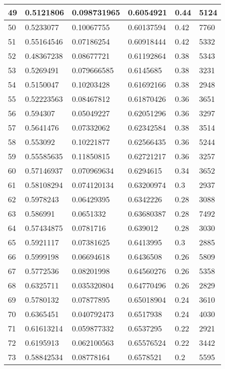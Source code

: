 \begin{longtable}{|l|l|l|l|l|l|}
49 & 0.5121806 & 0.098731965 & 0.6054921 & 0.44 & 5124 \\ \hline 
50 & 0.5233077 & 0.10067755 & 0.60137594 & 0.42 & 7760 \\ \hline 
51 & 0.55164546 & 0.07186254 & 0.60918444 & 0.42 & 5332 \\ \hline 
52 & 0.48367238 & 0.08677721 & 0.61192864 & 0.38 & 5343 \\ \hline 
53 & 0.5269491 & 0.079666585 & 0.6145685 & 0.38 & 3231 \\ \hline 
54 & 0.5150047 & 0.10203428 & 0.61692166 & 0.38 & 2948 \\ \hline 
55 & 0.52223563 & 0.08467812 & 0.61870426 & 0.36 & 3651 \\ \hline 
56 & 0.594307 & 0.05049227 & 0.62051296 & 0.36 & 3297 \\ \hline 
57 & 0.5641476 & 0.07332062 & 0.62342584 & 0.38 & 3514 \\ \hline 
58 & 0.553092 & 0.10221877 & 0.62566435 & 0.36 & 5244 \\ \hline 
59 & 0.55585635 & 0.11850815 & 0.62721217 & 0.36 & 3257 \\ \hline 
60 & 0.57146937 & 0.070969634 & 0.6294615 & 0.34 & 3652 \\ \hline 
61 & 0.58108294 & 0.074120134 & 0.63200974 & 0.3 & 2937 \\ \hline 
62 & 0.5978243 & 0.06429395 & 0.6342226 & 0.28 & 3088 \\ \hline 
63 & 0.586991 & 0.0651332 & 0.63680387 & 0.28 & 7492 \\ \hline 
64 & 0.57434875 & 0.0781716 & 0.639012 & 0.28 & 3030 \\ \hline 
65 & 0.5921117 & 0.07381625 & 0.6413995 & 0.3 & 2885 \\ \hline 
66 & 0.5999198 & 0.06694618 & 0.6436508 & 0.26 & 5809 \\ \hline 
67 & 0.5772536 & 0.08201998 & 0.64560276 & 0.26 & 5358 \\ \hline 
68 & 0.6325711 & 0.035320804 & 0.64770496 & 0.26 & 2829 \\ \hline 
69 & 0.5780132 & 0.07877895 & 0.65018904 & 0.24 & 3610 \\ \hline 
70 & 0.6365451 & 0.040792473 & 0.6517938 & 0.24 & 4030 \\ \hline 
71 & 0.61613214 & 0.059877332 & 0.6537295 & 0.22 & 2921 \\ \hline 
72 & 0.6195913 & 0.062100563 & 0.65576524 & 0.22 & 3442 \\ \hline 
73 & 0.58842534 & 0.08778164 & 0.6578521 & 0.2 & 5595 \\ \hline 

\end{longtable}
